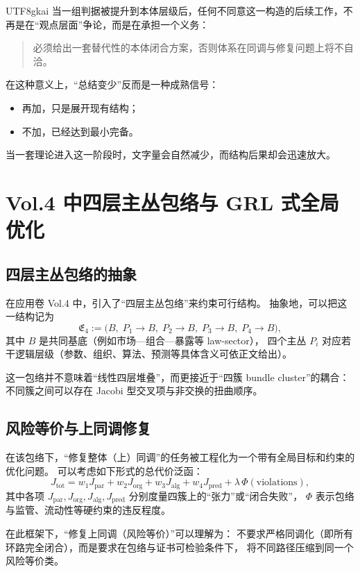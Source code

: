 \documentclass[12pt]{article}
\begin{document}
\begin{CJK*}{UTF8}{gkai}
当一组判据被提升到本体层级后，任何不同意这一构造的后续工作，不再是在“观点层面”争论，而是在承担一个义务：
\begin{quote}
必须给出一套替代性的本体闭合方案，否则体系在同调与修复问题上将不自洽。
\end{quote}

在这种意义上，“总结变少”反而是一种成熟信号：
\begin{itemize}
  \item 再加，只是展开现有结构；
  \item 不加，已经达到最小完备。
\end{itemize}

当一套理论进入这一阶段时，文字量会自然减少，而结构后果却会迅速放大。


\section{Vol.4 中四层主丛包络与 GRL 式全局优化}

\subsection{四层主丛包络的抽象}

在应用卷 Vol.4 中，引入了“四层主丛包络”来约束可行结构。
抽象地，可以把这一结构记为
\[
  \mathfrak{E}_4 := \bigl(B,\;P_1\to B,\;P_2\to B,\;P_3\to B,\;P_4\to B\bigr),
\]
其中 $B$ 是共同基底（例如市场—组合—暴露等 law-sector），
四个主丛 $P_i$ 对应若干逻辑层级（参数、组织、算法、预测等具体含义可依正文给出）。

这一包络并不意味着“线性四层堆叠”，而更接近于“四簇 bundle cluster”的耦合：
不同簇之间可以存在 Jacobi 型交叉项与非交换的扭曲顺序。

\subsection{风险等价与上同调修复}

在该包络下，“修复整体（上）同调”的任务被工程化为一个带有全局目标和约束的优化问题。
可以考虑如下形式的总代价泛函：
\[
  J_{\text{tot}}
  = w_1 J_{\text{par}} + w_2 J_{\text{org}} + w_3 J_{\text{alg}} + w_4 J_{\text{pred}}
    + \lambda\,\Phi(\text{violations}),
\]
其中各项 $J_{\text{par}},J_{\text{org}},J_{\text{alg}},J_{\text{pred}}$ 分别度量四簇上的“张力”或“闭合失败”，
$\Phi$ 表示包络与监管、流动性等硬约束的违反程度。

在此框架下，“修复上同调（风险等价）”可以理解为：
不要求严格同调化（即所有环路完全闭合），而是要求在包络与证书可检验条件下，
将不同路径压缩到同一个风险等价类。


\end{CJK*}
\end{document}

